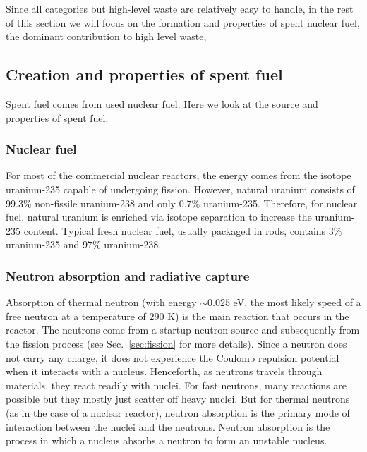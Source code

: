 \documentclass[nofootinbib,preprint,aps]{revtex4-1}
\begin{document}
    Since all categories but high-level waste are relatively easy to handle, in the rest of
    this section we will focus on the formation and
    properties of spent nuclear fuel, the dominant contribution to high level waste,

    \subsection{Creation and properties of spent fuel}
    \label{sec:waste:spentfuel}
    Spent fuel comes from used nuclear fuel. Here we look at the source and properties of spent fuel.
    \subsubsection{Nuclear fuel}
    For most of the commercial nuclear reactors, the energy comes from the isotope uranium-235 capable
    of undergoing fission.
    However, natural uranium consists of $99.3\%$
    non-fissile uranium-238 and only $0.7\%$ uranium-235. Therefore, for nuclear fuel, natural uranium is enriched
    via isotope separation to increase the uranium-235 content. Typical fresh nuclear fuel, usually packaged in
    rods, contains $3\%$ uranium-235 and $97\%$ uranium-238.

    \subsubsection{Neutron absorption and radiative capture}
    \label{sec:capture}
    Absorption of thermal neutron (with energy $\sim 0.025$ eV, the most likely speed of a free neutron at 
    a temperature of $290$ K) is the main reaction that
    occurs in the reactor. The neutrons come from a startup neutron source and subsequently from the fission
    process (see Sec.~\ref{sec:fission} for more details).
    Since a neutron does not carry any charge, it does not experience the Coulomb repulsion potential when
    it interacts
    with a nucleus.
    Henceforth, as neutrons travels through materials, they react readily with nuclei.
    For fast neutrons, many reactions are possible but they mostly just scatter off heavy nuclei.
    But for thermal neutrons (as in the case of a nuclear reactor), neutron absorption
    is the primary mode of interaction between the nuclei and the neutrons.
    Neutron absorption is the process in which a nucleus absorbs a neutron to form an unstable
    nucleus.
\end{document}
